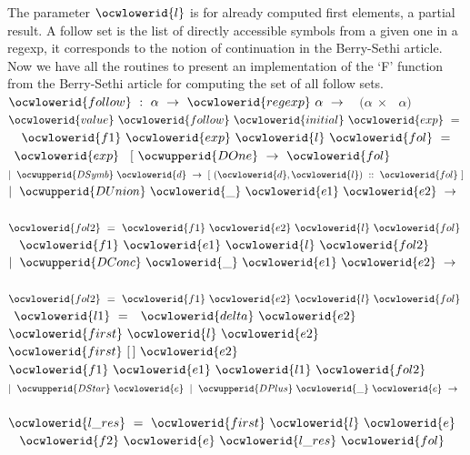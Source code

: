 \documentclass[12pt]{article}
\begin{document}
\ocwendcode{}\ocwindent{0.00em}
The parameter \ocwbegindcode{}$\ocwlowerid{l}$\ocwenddcode{} is for already computed first elements, a partial 
   result.
\ocweol
\ocwindent{0.00em}
A follow set is the list of directly accessible symbols from a given one in
   a regexp, it corresponds to the notion of continuation in the Berry-Sethi
   article. Now we have all the routines to present an implementation of 
   the `F' function from the Berry-Sethi article for computing the set 
   of all follow sets. 
\ocweol
\ocwindent{0.00em}
\ocwbegindcode{}$\ocwlowerid{follow}~:~\alpha{}~\rightarrow{}~\ocwlowerid{regexp}~\alpha{}~\rightarrow{}~$~$(\alpha{}~\times{}~$~$\alpha{})$\ocwenddcode{} 
\ocweol
\label{../ML/regular.ml:9270}%
\medskip
\ocwbegincode{}\ocwindent{0.00em}
$\ocwlowerid{value}~\ocwlowerid{follow}~\ocwlowerid{initial}~\ocwlowerid{exp}~=~$\ocweol
\ocwindent{1.00em}
~~$\ocwlowerid{f1}~\ocwlowerid{exp}~\ocwlowerid{l}~\ocwlowerid{fol}~=~$\ocweol
\ocwindent{2.00em}
~$\ocwlowerid{exp}~$\ocweol
\ocwindent{2.00em}
$[~\ocwupperid{DOne}~\rightarrow{}~\ocwlowerid{fol}$\ocweol
\ocwindent{2.00em}
$\mid{}~\ocwupperid{DSymb}~\ocwlowerid{d}~\rightarrow{}~[~(\ocwlowerid{d},\ocwlowerid{l})~::~\ocwlowerid{fol}~]$\ocweol
\ocwindent{2.00em}
$\mid{}~\ocwupperid{DUnion}~\ocwlowerid{\_}~\ocwlowerid{e1}~\ocwlowerid{e2}~\rightarrow{}~$\ocweol
\ocwindent{3.50em}
~$\ocwlowerid{fol2}~=~\ocwlowerid{f1}~\ocwlowerid{e2}~\ocwlowerid{l}~\ocwlowerid{fol}~$~\ocweol
\ocwindent{3.50em}
$\ocwlowerid{f1}~\ocwlowerid{e1}~\ocwlowerid{l}~\ocwlowerid{fol2}~$\ocweol
\ocwindent{2.00em}
$\mid{}~\ocwupperid{DConc}~\ocwlowerid{\_}~\ocwlowerid{e1}~\ocwlowerid{e2}~\rightarrow{}~$\ocweol
\ocwindent{3.50em}
~$\ocwlowerid{fol2}~=~\ocwlowerid{f1}~\ocwlowerid{e2}~\ocwlowerid{l}~\ocwlowerid{fol}~$\ocweol
\ocwindent{3.50em}
~$\ocwlowerid{l1}~=~$~$\ocwlowerid{delta}~\ocwlowerid{e2}~$~$\ocwlowerid{first}~\ocwlowerid{l}~\ocwlowerid{e2}~$~$\ocwlowerid{first}~[\,]~\ocwlowerid{e2}~$\ocweol
\ocwindent{3.50em}
$\ocwlowerid{f1}~\ocwlowerid{e1}~\ocwlowerid{l1}~\ocwlowerid{fol2}$\ocweol
\ocwindent{2.00em}
$\mid{}~\ocwupperid{DStar}~\ocwlowerid{e}~\mid{}~\ocwupperid{DPlus}~\ocwlowerid{\_}~\ocwlowerid{e}~\rightarrow{}~$\ocweol
\ocwindent{3.50em}
~$\ocwlowerid{l\_res}~=~\ocwlowerid{first}~\ocwlowerid{l}~\ocwlowerid{e}~$~\ocweol
\ocwindent{3.50em}
$\ocwlowerid{f2}~\ocwlowerid{e}~\ocwlowerid{l\_res}~\ocwlowerid{fol}$\ocweol
\ocwindent{2.00em}
\end{document}
